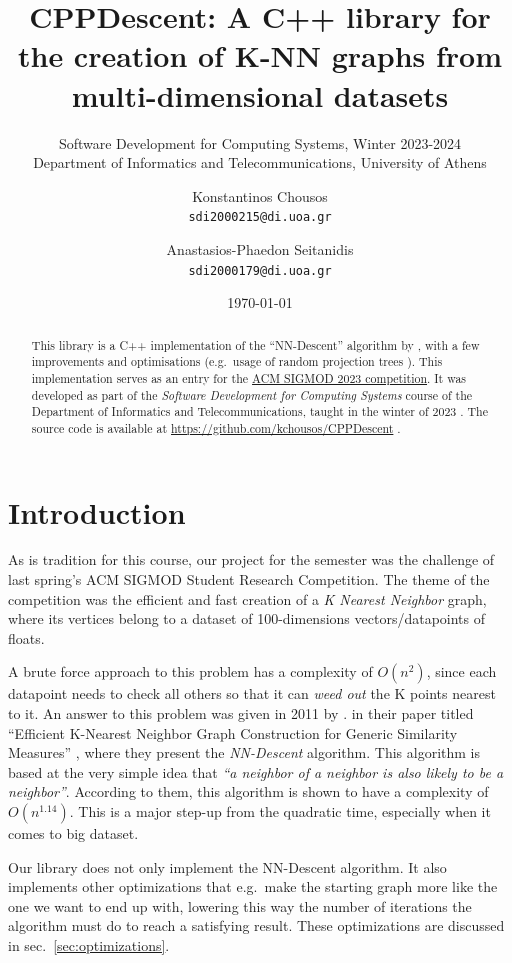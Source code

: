 \documentclass[
  10,
  letterpaperpaper,
  twocolumn]{article}
\title{CPPDescent: A C++ library for the creation of K-NN graphs from
multi-dimensional datasets}
\subtitle{Software Development for Computing Systems, Winter
2023-2024\\\medskip Department of Informatics and Telecommunications, University of Athens}
\author{Konstantinos
Chousos\\\medskip \texttt{sdi2000215@di.uoa.gr} \and Anastasios-Phaedon
Seitanidis\\\medskip \texttt{sdi2000179@di.uoa.gr}}
\date{\today}
\begin{document}
\maketitle

\begin{abstract}{}{}%
This library is a C++ implementation of the ``NN-Descent'' algorithm by
\textcite{dongEfficientKnearestNeighbor2011}, with a few improvements
and optimisations (e.g.~usage of random projection trees
\autocite{dasguptaRandomProjectionTrees2008}). This implementation
serves as an entry for the
\href{https://2023.sigmod.org/sigmod_student_research_competition.shtml}{ACM
SIGMOD 2023 competition}. It was developed as part of the \emph{Software
Development for Computing Systems} course of the Department of
Informatics and Telecommunications, taught in the winter of 2023
\autocite{ioannidisAnaptyxiLogismikoyGia}. The source code is available
at \url{https://github.com/kchousos/CPPDescent}
\autocite{chousosKchousosCPPDescent2024}.%
\end{abstract}

\section{Introduction}\label{introduction}

As is tradition for this course, our project for the semester was the
challenge of last spring's ACM SIGMOD Student Research Competition. The
theme of the competition was the efficient and fast creation of a
\emph{K Nearest Neighbor} graph, where its vertices belong to a dataset
of 100-dimensions vectors/datapoints of floats.

A brute force approach to this problem has a complexity of \(O(n^2)\),
since each datapoint needs to check all others so that it can \emph{weed
out} the K points nearest to it. An answer to this problem was given in
2011 by \textcite{dongEfficientKnearestNeighbor2011}. in their paper
titled ``Efficient K-Nearest Neighbor Graph Construction for Generic
Similarity Measures'' \autocite{dongEfficientKnearestNeighbor2011},
where they present the \emph{NN-Descent} algorithm. This algorithm is
based at the very simple idea that \emph{``a neighbor of a neighbor is
also likely to be a neighbor''}. According to them, this algorithm is
shown to have a complexity of \(O(n^{1.14})\). This is a major step-up
from the quadratic time, especially when it comes to big dataset.

Our library does not only implement the NN-Descent algorithm. It also
implements other optimizations that e.g.~make the starting graph more
like the one we want to end up with, lowering this way the number of
iterations the algorithm must do to reach a satisfying result. These
optimizations are discussed in sec.~\ref{sec:optimizations}.
\end{document}
